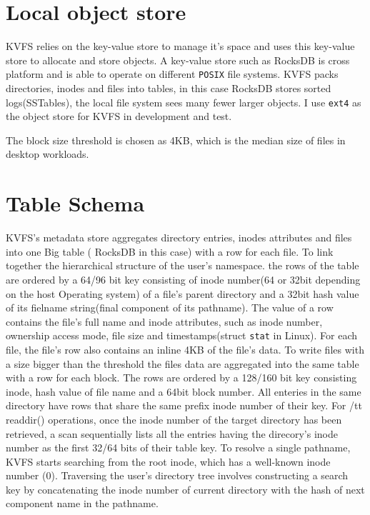 \documentclass[bsc,frontabs,twoside,singlespacing,parskip,deptreport]{infthesis}     %
\begin{document}
\section{Local object store}
KVFS relies on the key-value store to manage it's space and uses this key-value store to allocate and store objects. A key-value store such as RocksDB is cross platform and is able to operate on different {\tt POSIX} file systems.
KVFS packs directories, inodes and files into tables, in this case RocksDB stores sorted logs(SSTables), the local file system sees many fewer larger objects. I use {\tt ext4} as the object store for KVFS in development and test.

The block size threshold is chosen as 4KB, which is the median size of files in desktop workloads.

\section{Table Schema}
{
KVFS's metadata store aggregates directory entries, inodes attributes and files into one Big table ( RocksDB in this case) with a row for each file. To link together the hierarchical structure of the user's namespace. the rows of the table are ordered by a 64/96 bit key consisting of inode number(64 or 32bit depending on the host Operating system) of a file's parent directory and a 32bit hash value of its fielname string(final component of its pathname). The value of a row contains the file's full name and inode attributes, such as inode number, ownership access mode, file size and timestamps(struct {\tt stat} in Linux).
For each file, the file's row also contains an inline 4KB of the file's data.
To write files with a size bigger than the threshold the files data are aggregated into the same table with a row for each block. The rows are ordered by a 128/160 bit key consisting inode, hash value of file name and a 64bit block number.
All enteries in the same directory have rows that share the same prefix inode number of their key. For {/tt readdir()} operations, once the inode number of the target directory has been retrieved, a scan sequentially lists all the entries having the direcory's inode number as the first 32/64 bits of their table key. To resolve a single pathname, KVFS starts searching from the root inode, which has a well-known inode number (0). Traversing the user's directory tree involves constructing a search key by concatenating the inode number of current directory with the hash of next component name in the pathname.}
\end{document}
